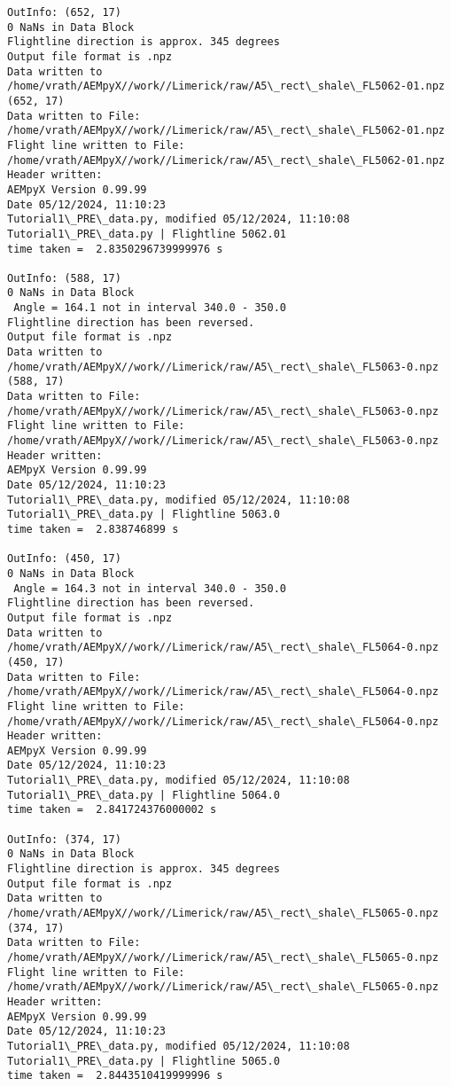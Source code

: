 \documentclass[11pt]{article}
\begin{document}
\begin{Verbatim}[commandchars=\\\{\}]
OutInfo: (652, 17)
0 NaNs in Data Block
Flightline direction is approx. 345 degrees
Output file format is .npz
Data written to
/home/vrath/AEMpyX//work//Limerick/raw/A5\_rect\_shale\_FL5062-01.npz
(652, 17)
Data written to File:
/home/vrath/AEMpyX//work//Limerick/raw/A5\_rect\_shale\_FL5062-01.npz
Flight line written to File:
/home/vrath/AEMpyX//work//Limerick/raw/A5\_rect\_shale\_FL5062-01.npz
Header written:
AEMpyX Version 0.99.99
Date 05/12/2024, 11:10:23
Tutorial1\_PRE\_data.py, modified 05/12/2024, 11:10:08
Tutorial1\_PRE\_data.py | Flightline 5062.01
time taken =  2.8350296739999976 s

OutInfo: (588, 17)
0 NaNs in Data Block
 Angle = 164.1 not in interval 340.0 - 350.0
Flightline direction has been reversed.
Output file format is .npz
Data written to
/home/vrath/AEMpyX//work//Limerick/raw/A5\_rect\_shale\_FL5063-0.npz
(588, 17)
Data written to File:
/home/vrath/AEMpyX//work//Limerick/raw/A5\_rect\_shale\_FL5063-0.npz
Flight line written to File:
/home/vrath/AEMpyX//work//Limerick/raw/A5\_rect\_shale\_FL5063-0.npz
Header written:
AEMpyX Version 0.99.99
Date 05/12/2024, 11:10:23
Tutorial1\_PRE\_data.py, modified 05/12/2024, 11:10:08
Tutorial1\_PRE\_data.py | Flightline 5063.0
time taken =  2.838746899 s

OutInfo: (450, 17)
0 NaNs in Data Block
 Angle = 164.3 not in interval 340.0 - 350.0
Flightline direction has been reversed.
Output file format is .npz
Data written to
/home/vrath/AEMpyX//work//Limerick/raw/A5\_rect\_shale\_FL5064-0.npz
(450, 17)
Data written to File:
/home/vrath/AEMpyX//work//Limerick/raw/A5\_rect\_shale\_FL5064-0.npz
Flight line written to File:
/home/vrath/AEMpyX//work//Limerick/raw/A5\_rect\_shale\_FL5064-0.npz
Header written:
AEMpyX Version 0.99.99
Date 05/12/2024, 11:10:23
Tutorial1\_PRE\_data.py, modified 05/12/2024, 11:10:08
Tutorial1\_PRE\_data.py | Flightline 5064.0
time taken =  2.841724376000002 s

OutInfo: (374, 17)
0 NaNs in Data Block
Flightline direction is approx. 345 degrees
Output file format is .npz
Data written to
/home/vrath/AEMpyX//work//Limerick/raw/A5\_rect\_shale\_FL5065-0.npz
(374, 17)
Data written to File:
/home/vrath/AEMpyX//work//Limerick/raw/A5\_rect\_shale\_FL5065-0.npz
Flight line written to File:
/home/vrath/AEMpyX//work//Limerick/raw/A5\_rect\_shale\_FL5065-0.npz
Header written:
AEMpyX Version 0.99.99
Date 05/12/2024, 11:10:23
Tutorial1\_PRE\_data.py, modified 05/12/2024, 11:10:08
Tutorial1\_PRE\_data.py | Flightline 5065.0
time taken =  2.8443510419999996 s


\end{Verbatim}
\end{document}
